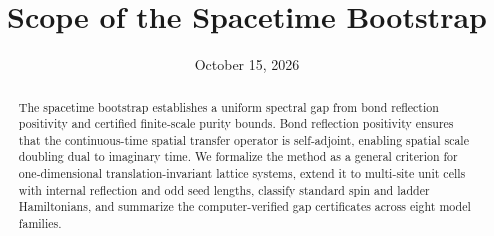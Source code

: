\documentclass[aps,prl,reprint,amsmath,amssymb,nofootinbib,raggedbottom]{revtex4-2}
\begin{document}
\title{Scope of the Spacetime Bootstrap}
\date{October 15, 2026}
\begin{abstract}
The spacetime bootstrap establishes a uniform spectral gap from bond reflection positivity and certified finite-scale purity bounds. Bond reflection positivity ensures that the continuous-time spatial transfer operator is self-adjoint, enabling spatial scale doubling dual to imaginary time. We formalize the method as a general criterion for one-dimensional translation-invariant lattice systems, extend it to multi-site unit cells with internal reflection and odd seed lengths, classify standard spin and ladder Hamiltonians, and summarize the computer-verified gap certificates across eight model families.
\end{abstract}
\maketitle
\setlength{\abovedisplayskip}{5pt plus 2pt minus 1pt}
\setlength{\belowdisplayskip}{5pt plus 2pt minus 1pt}

\appendix
\setcounter{secnumdepth}{2}
\setcounter{section}{3}
\end{document}
